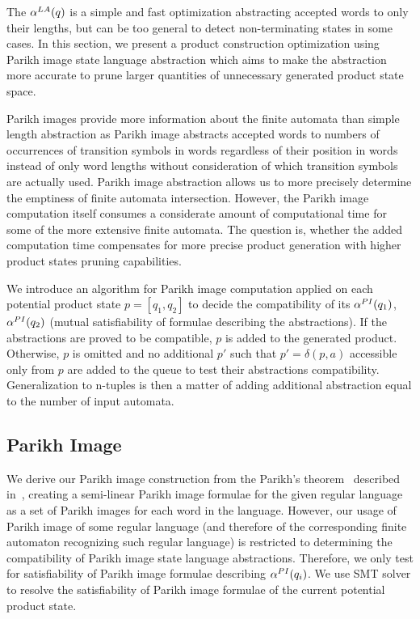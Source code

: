 The $\alpha^{LA}(q)$ is a simple and fast optimization abstracting accepted words to only their lengths, but can be too general to detect non-terminating states in some cases. In this section, we present a product construction optimization using Parikh image state language abstraction which aims to make the abstraction more accurate to prune larger quantities of unnecessary generated product state space.

Parikh images provide more information about the finite automata than simple length abstraction as Parikh image abstracts accepted words to numbers of occurrences of transition symbols in words regardless of their position in words instead of only word lengths without consideration of which transition symbols are actually used. Parikh image abstraction allows us to more precisely determine the emptiness of finite automata intersection. However, the Parikh image computation itself consumes a considerate amount of computational time for some of the more extensive finite automata. The question is, whether the added computation time compensates for more precise product generation with higher product states pruning capabilities.

We introduce an algorithm for Parikh image computation applied on each potential product state $p = [q_1, q_2]$ to decide the compatibility of its $\alpha^{PI}(q_1)$, $\alpha^{PI}(q_2)$ (mutual satisfiability of formulae describing the abstractions). If the abstractions are proved to be compatible, $p$ is added to the generated product. Otherwise, $p$ is omitted and no additional $p'$ such that $p' = \delta(p, a)$ accessible only from $p$ are added to the queue to test their abstractions compatibility. Generalization to n-tuples is then a matter of adding additional abstraction equal to the number of input automata.

\subsection{Parikh Image} \label{sec:parikhImage}

We derive our Parikh image construction from the Parikh's theorem~\cite{Kozen1977} described in~\cite{ParikhsTheoremSimpleAndDirectConstruction}, creating a semi-linear Parikh image formulae for the given regular language as a set of Parikh images for each word in the language. However, our usage of Parikh image of some regular language (and therefore of the corresponding finite automaton recognizing such regular language) is restricted to determining the compatibility of Parikh image state language abstractions. Therefore, we only test for satisfiability of Parikh image formulae describing $\alpha^{PI}(q_i)$. We use SMT solver to resolve the satisfiability of Parikh image formulae of the current potential product state.

